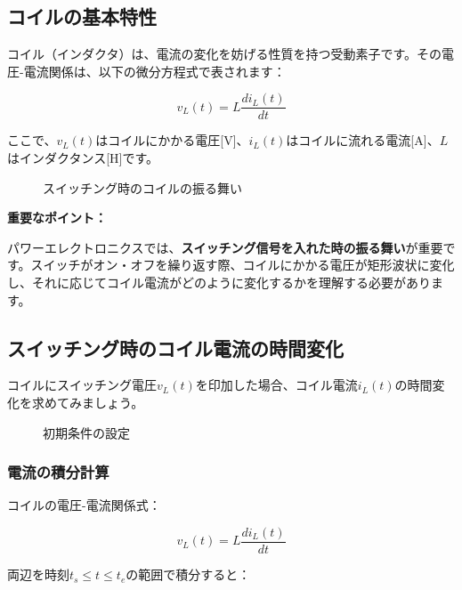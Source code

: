 \subsection{コイルの基本特性}

コイル（インダクタ）は、電流の変化を妨げる性質を持つ受動素子です。その電圧-電流関係は、以下の微分方程式で表されます：

\begin{equation}
v_L(t) = L \frac{di_L(t)}{dt}
\end{equation}

ここで、$v_L(t)$はコイルにかかる電圧[V]、$i_L(t)$はコイルに流れる電流[A]、$L$はインダクタンス[H]です。

\begin{figure}[H]
\centering
{}
\caption{スイッチング時のコイルの振る舞い}
\label{fig:ch04_inductor_switching}
\end{figure}

\textbf{重要なポイント：}

パワーエレクトロニクスでは、\textbf{スイッチング信号を入れた時の振る舞い}が重要です。スイッチがオン・オフを繰り返す際、コイルにかかる電圧が矩形波状に変化し、それに応じてコイル電流がどのように変化するかを理解する必要があります。

\subsection{スイッチング時のコイル電流の時間変化}

コイルにスイッチング電圧$v_L(t)$を印加した場合、コイル電流$i_L(t)$の時間変化を求めてみましょう。

\begin{figure}[H]
\centering
{}
\caption{初期条件の設定}
\label{fig:ch04_inductor_initial}
\end{figure}

\subsubsection{電流の積分計算}

コイルの電圧-電流関係式：

\begin{equation}
v_L(t) = L \frac{di_L(t)}{dt}
\end{equation}

両辺を時刻$t_s \leq t \leq t_e$の範囲で積分すると：

